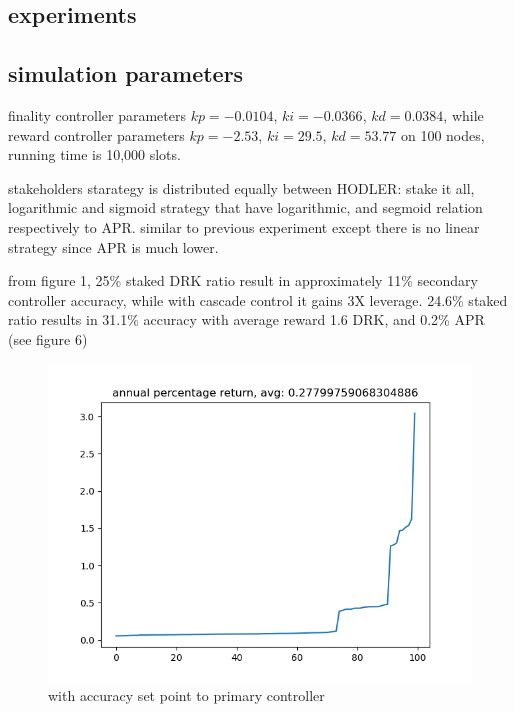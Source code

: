 \documentclass{article}
\begin{document}
\subsection {experiments}
\begin{description}
\subsection {simulation parameters}
\item finality controller parameters  $kp=-0.0104$, $ki=-0.0366$, $kd=0.0384$, while reward controller parameters  $kp=-2.53$, $ki=29.5$, $kd=53.77$ on 100 nodes, running time is 10,000 slots.
  \item stakeholders starategy is distributed equally between HODLER: stake it all,  logarithmic and sigmoid strategy that have logarithmic, and segmoid relation respectively to APR. similar to previous experiment except there is no linear strategy since APR is much lower.


\item from figure 1, 25\% staked DRK ratio result in approximately 11\% secondary controller accuracy, while with cascade control it gains 3X leverage. 24.6\% staked ratio results in 31.1\% accuracy with average reward 1.6 DRK, and 0.2\% APR (see figure 6)
\end{description}
\begin{figure}
    \includegraphics{acc_setpoint_quarterstake.png}
    \caption{with accuracy set point to primary controller}
\end{figure}
\end{document}
